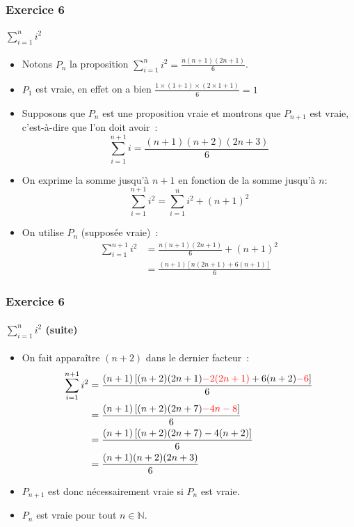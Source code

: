 \documentclass[10pt,notheorems]{beamer}
\newcommand{\red}{\color{red}}
\theoremstyle{plain}
\theoremstyle{definition} %
\begin{document}
\begin{frame}
  \frametitle{Exercice 6}
  \framesubtitle{$\sum_{i=1}^n i^2$}
  \fontsize{8}{10}\selectfont

  \begin{itemize}

  \item Notons $P_n$ la proposition $\sum_{i=1}^n i^2 = \frac{n(n+1)(2n+1)}{6}$.\newline

  \item $P_1$ est vraie, en effet on a bien $\frac{1 \times (1+1) \times (2\times 1 + 1)}{6} = 1$\newline

  \item Supposons que $P_n$ est une proposition vraie et montrons que $P_{n+1}$ est vraie, c'est-à-dire  que l'on doit avoir~:
    \[
      \sum_{i=1}^{n+1} i = \frac{(n+1)(n+2)(2n+3)}{6}
    \]

  \item On exprime la somme jusqu'à $n+1$ en fonction de la somme jusqu'à $n$:
    \[
      \sum_{i=1}^{n+1} i^2 = \sum_{i=1}^{n} i^2 + (n+1)^2
    \]

  \item On utilise $P_n$ (supposée vraie)~:
    \[
      \begin{split}
        \sum_{i=1}^{n+1} i^2 &= \frac{n(n+1)(2n+1)}{6} + (n+1)^2\\
        &= \frac{(n+1)\left[n(2n+1)+6(n+1)\right]}{6}
      \end{split}
    \]
    
  \end{itemize}
  
\end{frame}


\begin{frame}
  \frametitle{Exercice 6}
  \framesubtitle{$\sum_{i=1}^n i^2$ (suite)}
  \fontsize{8}{10}\selectfont

  \begin{itemize}

  \item On fait apparaître $(n+2)$ dans le dernier facteur~:
    \[
      \begin{split}
        \sum_{i=1}^{n+1} i^2 &= \frac{(n+1)\left[(n+2)(2n+1){\red -2(2n+1)}+6(n+2){\red-6}\right]}{6}\\
        &= \frac{(n+1)\left[(n+2)(2n+7){\red -4n-8}\right]}{6}\\
        &= \frac{(n+1)\left[(n+2)(2n+7)-4(n+2)\right]}{6}\\
        &= \frac{(n+1)(n+2)(2n+3)}{6}\\
      \end{split}
    \]

  \item $P_{n+1}$ est donc nécessairement vraie si $P_{n}$ est vraie.\newline

  \item $P_n$ est vraie pour tout $n\in\mathbb N$.
    
  \end{itemize}
  
\end{frame}
\end{document}
